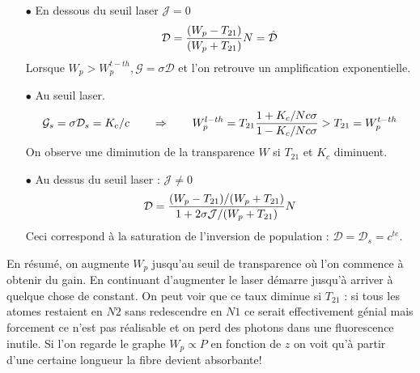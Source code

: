 \begin{itemize}
\item[$\bullet$] En dessous du seuil laser $\mathcal{J}=0$
\begin{equation}
{{\cal D}} = \frac{{({W_p} - {T_{21}})}}{{({W_p} + {T_{21}})}}N = {\hat {\cal D}}
\end{equation}
Lorsque $W_p > W_p^{t-th}, \mathcal{G}=\sigma\mathcal{D}$ et l'on retrouve un amplification 
exponentielle.
\item[$\bullet$] Au seuil laser.
\begin{equation}
{{{\cal G}}_s} = \sigma {{{\cal D}}_s} = {K_c}/c\qquad\Rightarrow\qquad 
W_p^{l - th} = {T_{21}}\frac{{1 + {K_c}/Nc\sigma }}{{1 - {K_c}/Nc\sigma }} > {T_{21}} = W_p^{t - th}
\end{equation}
On observe une diminution de la transparence $W$ si $T_{21}$ et $K_c$ diminuent.
\item[$\bullet$] Au dessus du seuil laser : $\mathcal{J}\neq0$
\begin{equation}
{{\cal D}} = \frac{{({W_p} - {T_{21}})/({W_p} + {T_{21}})}}{{1 + 2\sigma {{\cal J}}/({W_p} + {T_{21}})}}N
\end{equation}
Ceci correspond à la saturation de l'inversion de population : $\mathcal{D}=\mathcal{D}_s=c^{te}$.
\end{itemize}
En résumé, on augmente $W_p$ jusqu'au seuil de transparence où l'on commence à obtenir du gain. En 
continuant d'augmenter le laser démarre jusqu'à arriver à quelque chose de constant. On peut voir 
que ce taux diminue si $T_{21}$ : si tous les atomes restaient en $N2$ sans redescendre en $N1$ ce 
serait effectivement génial mais forcement ce n'est pas réalisable et on perd des photons dans une
fluorescence inutile. Si l'on regarde le graphe $W_p\propto P$ en fonction de $z$ on voit qu'à partir
d'une certaine longueur la fibre devient absorbante!




\newpage
